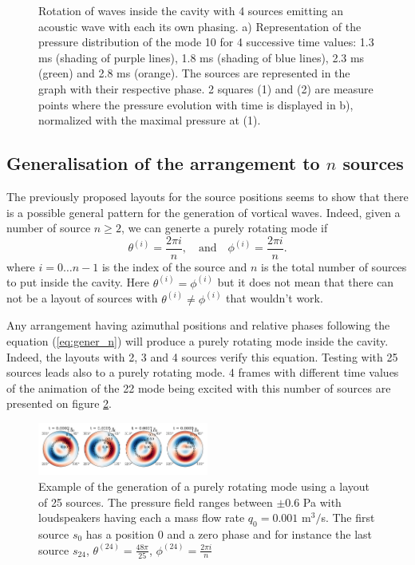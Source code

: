 \documentclass[%
 reprint,
 amsmath,amssymb,
 aps,
]{revtex4-2}
\begin{document}
\begin{figure}
   \centering 
   \def\svgwidth{0.45\textwidth}
   
   \caption{Rotation of waves inside the cavity with 4 sources emitting an acoustic wave with each its own phasing. a) Representation of the pressure distribution of the mode 10 for 4 successive time values: 1.3 ms (shading of purple lines), 1.8 ms (shading of blue lines), 2.3 ms (green) and 2.8 ms (orange). The sources are represented in the graph with their respective phase. 2 squares (1) and (2) are measure points where the pressure evolution with time is displayed in b), normalized with the maximal pressure at (1).} 
   \label{fig:contour_time}
\end{figure}

\subsection{Generalisation of the arrangement to $n$ sources}
The previously proposed layouts for the source positions seems to show that there is a possible general pattern for the generation of vortical waves. Indeed, given a number of source $n \ge 2$, we can generte a purely rotating mode if
\begin{equation}
    \theta^{(i)} = \frac{2 \pi i}{n}, \quad \text{and} \quad \phi^{(i)} = \frac{2 \pi i}{n}.
    \label{eq:gener_n}
\end{equation}
where $i = 0 \ldots n-1$ is the index of the source and $n$ is the total number of sources to put inside the cavity. Here $\theta^{(i)} = \phi^{(i)}$ but it does not mean that there can not be a layout of sources with $\theta^{(i)} \ne \phi^{(i)}$ that wouldn't work.

Any arrangement having azimuthal positions and relative phases following the equation (\ref{eq:gener_n}) will produce a purely rotating mode inside the cavity. Indeed, the layouts with 2, 3 and 4 sources verify this equation. Testing with 25 sources leads also to a purely rotating mode. 4 frames with different time values of the animation of the 22 mode being excited with this number of sources are presented on figure \ref{fig:pleindesources}. 

\begin{figure}
    \centering
    \includegraphics[width=0.5\textwidth]{figures/pleindesources.png}
    \caption{Example of the generation of a purely rotating mode using a layout of 25 sources. The pressure field ranges between $\pm 0.6$ Pa with loudspeakers having each a mass flow rate $q_0 = 0.001$ m$^3/$s. The first source $s_0$ has a position 0 and a zero phase and for instance the last source $s_{24}$, $\theta^{(24)} = \frac{48\pi}{25}$, $\phi^{(24)} = \frac{2 \pi i}{n}$}
    \label{fig:pleindesources}
\end{figure}
\end{document}
